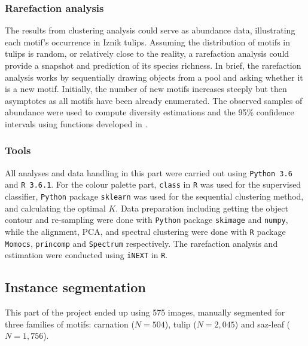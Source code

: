 \documentclass[11pt]{article}
\begin{document}
\subsubsection{Rarefaction analysis}
The results from clustering analysis could serve as abundance data, illustrating each motif's occurrence in Iznik tulips. Assuming the distribution of motifs in tulips is random, or relatively close to the reality, a rarefaction analysis could provide a snapshot and prediction of its species richness. In brief, the rarefaction analysis works by sequentially drawing objects from a pool and asking whether it is a new motif. Initially, the number of new motifs increases steeply but then asymptotes as all motifs have been already enumerated. The observed samples of abundance were used to compute diversity estimations and the 95\% confidence intervals using functions developed in \cite{rarearticle}.

\subsubsection{Tools}
All analyses and data handling in this part were carried out using \texttt{Python 3.6} and \texttt{R 3.6.1}. For the colour palette part, \texttt{class} in \texttt{R} was used for the supervised classifier, \texttt{Python} package \texttt{sklearn} was used for the sequential clustering method, and calculating the optimal $K$. 
Data preparation including getting the object contour and re-sampling were done with \texttt{Python} package \texttt{skimage} and \texttt{numpy}, while the alignment, PCA, and spectral clustering were done with \texttt{R} package \texttt{Momocs}, \texttt{princomp} and \texttt{Spectrum} respectively. The rarefaction analysis and estimation were conducted using \texttt{iNEXT} \parencite{inext} in \texttt{R}.


\subsection{Instance segmentation}
This part of the project ended up using 575 images, manually segmented for three families of motifs: carnation ($N=504$), tulip ($N=2,045$) and saz-leaf ($N=1,756$).\par
\end{document}
